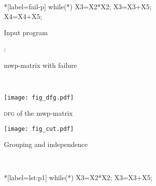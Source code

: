 \begin{figure}
\centering
\begin{subfigure}[t]{.25\textwidth}
\begin{minipage}{\textwidth}
\begin{implisting}*[label=fail-p]
while(*) {
  X3=X2*X2;
  X3=X3+X5;
  X4=X4+X5; }
\end{implisting}
\end{minipage}
\caption{Input program}\label{lst:whole-p}
\end{subfigure}%
\begin{subfigure}[t]{.75\textwidth}
\hfill{}:{}\hfill{}
\caption{mwp-matrix with failure}\label{fig:fail-matrix}
\end{subfigure} \\[1em]
\begin{subfigure}{.45\textwidth}
\centering
\texttt{[image: fig\_dfg.pdf]}
\caption{\textsc{dfg} of the mwp-matrix}\label{fig:fail-dfg}
\end{subfigure}\hfill%
\begin{subfigure}{.45\textwidth}
\centering
\texttt{[image: fig\_cut.pdf]}
\caption{Grouping and independence}\label{fig:group-part}
\end{subfigure} \\[1em]
\begin{subfigure}{\textwidth}{
\centering
\begin{minipage}{.35\textwidth}
\begin{implisting}*[label={lst:p1}]
while(*) {
  X3=X2*X2;
  X3=X3+X5; }

\end{implisting}
\end{minipage}}
\end{subfigure}
\end{figure}
